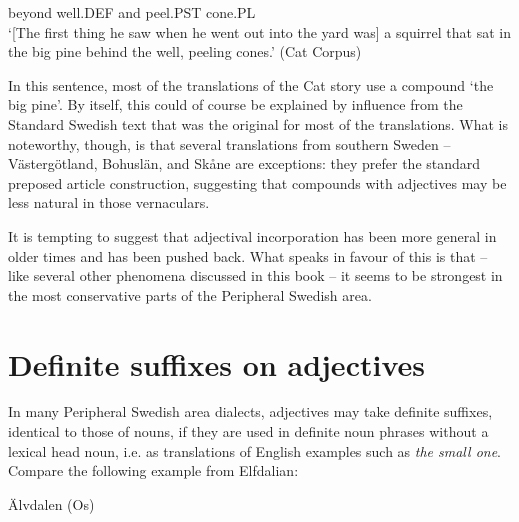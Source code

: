 beyond  well.DEF  and  peel.PST  cone.PL\\

\glt ‘[The first thing he saw when he went out into the yard was] a squirrel that sat in the big pine behind the well, peeling cones.’ (Cat Corpus)

\z

In this sentence, most of the translations of the Cat story use a compound  ‘the big pine’. By itself, this could of course be explained by influence from the Standard Swedish text that was the original for most of the translations. What is noteworthy, though, is that several translations from southern Sweden – Västergötland, Bohuslän, and Skåne are exceptions: they prefer the standard preposed article construction, suggesting that compounds with adjectives may be less natural in those vernaculars.


It is tempting to suggest that adjectival incorporation has been more general in older times and has been pushed back. What speaks in favour of this is that – like several other phenomena discussed in this book – it seems to be strongest in the most conservative parts of the Peripheral Swedish area. 


\section{Definite suffixes on adjectives}
\label{bkm:Ref155519944}
In many Peripheral Swedish area dialects, adjectives may take definite suffixes, identical to those of nouns, if they are used in definite noun phrases without a lexical head noun, i.e. as translations of English examples such as \textit{the small one}. Compare the following example from Elfdalian:


\item 

\label{bkm:Ref78439135}Älvdalen (Os)

